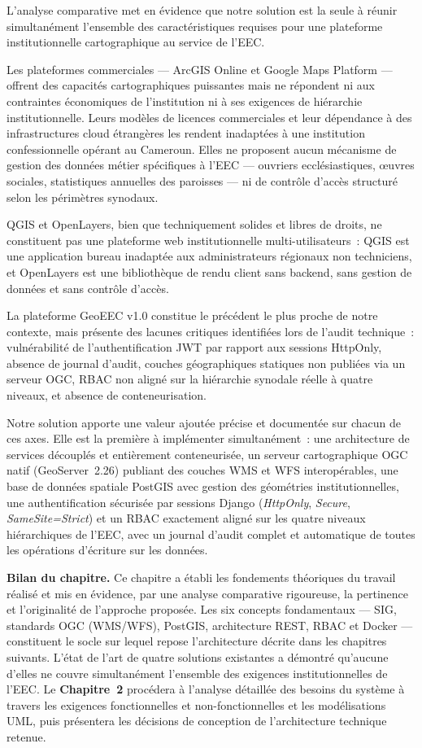 \documentclass[12pt, a4paper]{report}
\begin{document}
L'analyse comparative met en évidence que notre solution est la seule à réunir
simultanément l'ensemble des caractéristiques requises pour une plateforme
institutionnelle cartographique au service de l'EEC.

Les plateformes commerciales --- ArcGIS Online et Google Maps Platform --- offrent
des capacités cartographiques puissantes mais ne répondent ni aux contraintes
économiques de l'institution ni à ses exigences de hiérarchie institutionnelle.
Leurs modèles de licences commerciales et leur dépendance à des infrastructures
cloud étrangères les rendent inadaptées à une institution confessionnelle opérant
au Cameroun. Elles ne proposent aucun mécanisme de gestion des données métier
spécifiques à l'EEC --- ouvriers ecclésiastiques, œuvres sociales, statistiques
annuelles des paroisses --- ni de contrôle d'accès structuré selon les périmètres
synodaux.

QGIS et OpenLayers, bien que techniquement solides et libres de droits, ne
constituent pas une plateforme web institutionnelle multi-utilisateurs~: QGIS est
une application bureau inadaptée aux administrateurs régionaux non techniciens, et
OpenLayers est une bibliothèque de rendu client sans backend, sans gestion de
données et sans contrôle d'accès.

La plateforme GeoEEC v1.0 constitue le précédent le plus proche de notre contexte,
mais présente des lacunes critiques identifiées lors de l'audit technique~:
vulnérabilité de l'authentification JWT par rapport aux sessions HttpOnly, absence
de journal d'audit, couches géographiques statiques non publiées via un serveur
OGC, RBAC non aligné sur la hiérarchie synodale réelle à quatre niveaux, et absence
de conteneurisation.

Notre solution apporte une valeur ajoutée précise et documentée sur chacun de ces
axes. Elle est la première à implémenter simultanément~: une architecture de services
découplés et entièrement conteneurisée, un serveur cartographique OGC natif
(GeoServer~2.26) publiant des couches WMS et WFS interopérables, une base de données
spatiale PostGIS avec gestion des géométries institutionnelles, une authentification
sécurisée par sessions Django (\textit{HttpOnly}, \textit{Secure},
\textit{SameSite=Strict}) et un RBAC exactement aligné sur les quatre niveaux
hiérarchiques de l'EEC, avec un journal d'audit complet et automatique de toutes
les opérations d'écriture sur les données.

\medskip
\noindent\textbf{Bilan du chapitre.}
Ce chapitre a établi les fondements théoriques du travail réalisé et mis en
évidence, par une analyse comparative rigoureuse, la pertinence et l'originalité
de l'approche proposée. Les six concepts fondamentaux --- SIG, standards OGC
(WMS/WFS), PostGIS, architecture REST, RBAC et Docker --- constituent le socle sur
lequel repose l'architecture décrite dans les chapitres suivants. L'état de l'art
de quatre solutions existantes a démontré qu'aucune d'elles ne couvre simultanément
l'ensemble des exigences institutionnelles de l'EEC. Le \textbf{Chapitre~2} procédera
à l'analyse détaillée des besoins du système à travers les exigences fonctionnelles
et non-fonctionnelles et les modélisations UML, puis présentera les décisions de
conception de l'architecture technique retenue.
\end{document}

